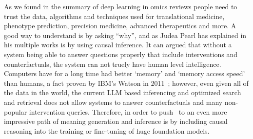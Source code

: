 As we found in the summary of deep learning in omics reviews people need to trust the data, algorithms and techniques used for translational medicine, phenotype prediction, precision medicine, advanced therapeutics and more.
A good way to understand is by asking ``why'', and as Judea Pearl \cite{Pearl:1995,Pearl:2009,Pearl:2019} has explained in his multiple works is by using causal inference.
It can argued that without a system being able to answer questions properly that include interventions and counterfactuals, the system can not truely have human level intelligence.
Computers have for a long time had better `memory' and `memory access speed' than humans, a fact proven by IBM's Watson in 2011~\cite{Ferrucci:2010_watson}; however, even given all of the data in the world, the current LLM based inferencing and optimized search and retrieval does not allow systems to answer counterfactuals and many non-popular intervention queries.
Therefore, in order to push \llms\ to an even more impressive path of meaning generation and inference is by including causal reasoning into the training or fine-tuning of huge foundation models.
